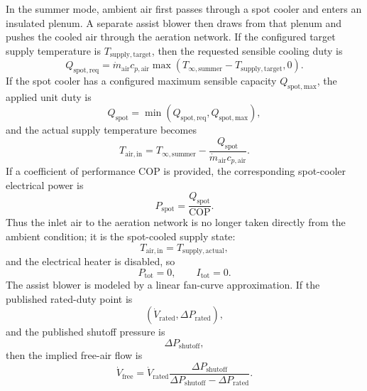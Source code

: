 \documentclass{article}
\begin{document}
In the summer mode, ambient air first passes through a spot cooler and enters
an insulated plenum. A separate assist blower then draws from that plenum and
pushes the cooled air through the aeration network. If the
configured target supply temperature is $T_{\mathrm{supply,target}}$, then the
requested sensible cooling duty is
\begin{equation}
Q_{\mathrm{spot,req}}
= \dot m_{\mathrm{air}} c_{p,\mathrm{air}}
\max\!\left(T_{\infty,\mathrm{summer}} - T_{\mathrm{supply,target}},0\right).
\end{equation}
If the spot cooler has a configured maximum sensible capacity
$Q_{\mathrm{spot,max}}$, the applied unit duty is
\begin{equation}
Q_{\mathrm{spot}}
= \min\!\left(Q_{\mathrm{spot,req}},Q_{\mathrm{spot,max}}\right),
\end{equation}
and the actual supply temperature becomes
\begin{equation}
T_{\mathrm{air,in}}
= T_{\infty,\mathrm{summer}}
- \frac{Q_{\mathrm{spot}}}{\dot m_{\mathrm{air}} c_{p,\mathrm{air}}}.
\end{equation}
If a coefficient of performance $\mathrm{COP}$ is provided, the corresponding
spot-cooler electrical power is
\begin{equation}
P_{\mathrm{spot}} = \frac{Q_{\mathrm{spot}}}{\mathrm{COP}}.
\end{equation}
Thus the inlet air to the aeration network is no longer taken directly from
the ambient condition; it is the spot-cooled supply state:
\begin{equation}
T_{\mathrm{air,in}} = T_{\mathrm{supply,actual}},
\end{equation}
and the electrical heater is disabled, so
\begin{equation}
P_{\mathrm{tot}} = 0,
\qquad
I_{\mathrm{tot}} = 0.
\end{equation}
The assist blower is modeled by a linear fan-curve approximation. If the
published rated-duty point is
\begin{equation}
\left(\dot V_{\mathrm{rated}}, \Delta P_{\mathrm{rated}}\right),
\end{equation}
and the published shutoff pressure is
\begin{equation}
\Delta P_{\mathrm{shutoff}},
\end{equation}
then the implied free-air flow is
\begin{equation}
\dot V_{\mathrm{free}}
=
\dot V_{\mathrm{rated}}
\frac{\Delta P_{\mathrm{shutoff}}}
{\Delta P_{\mathrm{shutoff}}-\Delta P_{\mathrm{rated}}}.
\end{equation}
\end{document}
